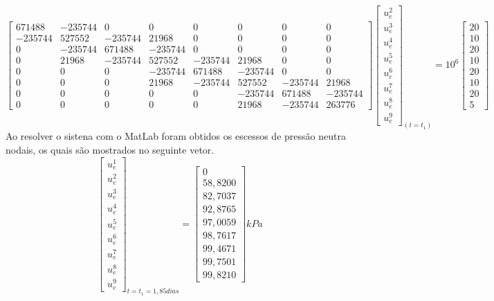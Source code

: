 \documentclass{article} %
\begin{document}
\begin{equation*}
\begin{bmatrix}
671488& -235744& 0& 0& 0& 0& 0& 0\\
-235744&527552&-235744&21968& 0& 0& 0& 0\\
0&-235744&671488&-235744& 0& 0& 0& 0\\
0&21968&-235744&527552&-235744&21968& 0& 0\\
0&0&0& -235744&671488&-235744& 0& 0\\
0&0&0&21968&-235744&527552&-235744&21968\\
0&0&0&0&0&-235744&671488&-235744\\
0&0&0&0&0&21968&-235744&263776
\end{bmatrix}\begin{bmatrix}
u_e^2\\
u_e^3\\
u_e^4\\
u_e^5\\
u_e^6\\
u_e^7\\
u_e^8\\
u_e^9
\end{bmatrix}_{(t=t_1)}
=10^6\begin{bmatrix}
20\\
10\\
20\\
10\\
20\\
10\\
20\\
5
\end{bmatrix}
\end{equation*}
\indent Ao resolver o sistena com o MatLab foram obtidos os escessos de pressão neutra nodais, os quais são mostrados no seguinte vetor.
\begin{equation}\label{t1}
\begin{bmatrix}
u_e^1\\
u_e^2\\
u_e^3\\
u_e^4\\
u_e^5\\
u_e^6\\
u_e^7\\
u_e^8\\
u_e^9
\end{bmatrix}_{t=t_1=1,85dias}=\begin{bmatrix}
0\\
58,8200\\
82,7037\\
92,8765\\
97,0059\\
98,7617\\
99,4671\\
99,7501\\
99,8210
\end{bmatrix}kPa
\end{equation}
\end{document}
